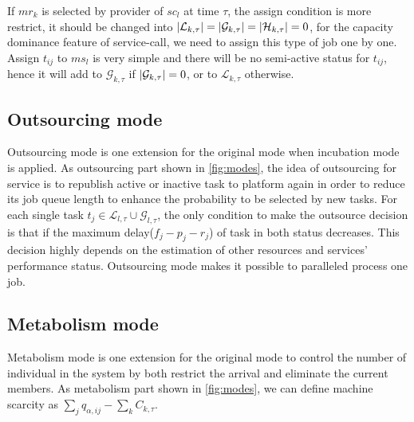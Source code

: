 If $mr_k$ is selected by provider of $sc_l$ at time $\tau$, the assign condition is more restrict, it should be changed into $\left|\mathcal{L}_{k,\tau}\right| = \left|\mathcal{G}_{k,\tau}\right| = \left|\mathcal{H}_{k,\tau}\right| = 0$, for the capacity dominance feature of service-call, we need to assign this type of job one by one. Assign $t_{ij}$ to $ms_l$ is very simple and there will be no semi-active status for $t_{ij}$, hence it will add to $\mathcal{G}_{k,\tau}$ if $\left|\mathcal{G}_{k,\tau}\right|=0$, or to $\mathcal{L}_{k,\tau}$ otherwise.





\subsection{Outsourcing mode} %
\label{sub:outsource_mode}
Outsourcing mode is one extension for the original mode when incubation mode is applied. As outsourcing part shown in \autoref{fig:modes},
the idea of outsourcing for service is to republish active or inactive task to platform again in order to reduce its job queue length to enhance the probability to be selected by new tasks. For each single task $t_j\in\mathcal{L}_{l,\tau}\cup\mathcal{G}_{l,\tau}$, the only condition to make the outsource decision is that if the maximum delay($f_j-p_j-r_j$) of task in both status decreases. This decision highly depends on the estimation of other resources and services' performance status. Outsourcing mode makes it possible to paralleled process one job.

\subsection{Metabolism mode} %
\label{sub:metabolism mode}
Metabolism mode is one extension for the original mode to control the number of individual in the system by both restrict the arrival and eliminate the current members. As metabolism part shown in \autoref{fig:modes},
we can define machine scarcity as $\sum_jq_{\alpha,ij} - \sum_kC_{k,\tau}$.

